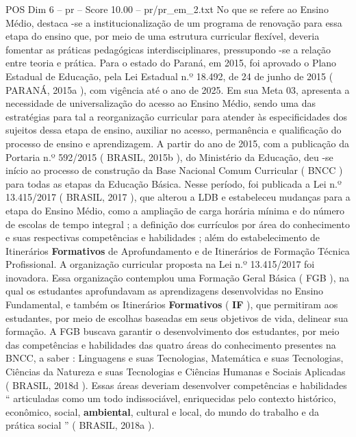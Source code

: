 \begin{textsample}{POS Dim 6 – pr – Score 10.00 – pr/pr\_em\_2.txt}
No que se refere ao Ensino Médio, destaca -se a institucionalização de um programa de renovação para essa etapa do ensino que, por meio de uma estrutura curricular flexível, deveria fomentar as práticas pedagógicas interdisciplinares, pressupondo -se a relação entre teoria e prática.
Para o estado do Paraná, em 2015, foi aprovado o Plano Estadual de Educação, pela Lei Estadual n.º 18.492, de 24 de junho de 2015 ( PARANÁ, 2015a ), com vigência até o ano de 2025.
Em sua Meta 03, apresenta a necessidade de universalização do acesso ao Ensino Médio, sendo uma das estratégias para tal a reorganização curricular para atender às especificidades dos sujeitos dessa etapa de ensino, auxiliar no acesso, permanência e qualificação do processo de ensino e aprendizagem.
A partir do ano de 2015, com a publicação da Portaria n.º 592/2015 ( BRASIL, 2015b ), do Ministério da Educação, deu -se início ao processo de construção da Base Nacional Comum Curricular ( BNCC ) para todas as etapas da Educação Básica.
Nesse período, foi publicada a Lei n.º 13.415/2017 ( BRASIL, 2017 ), que alterou a LDB e estabeleceu mudanças para a etapa do Ensino Médio, como a ampliação de carga horária mínima e do número de escolas de tempo integral ; a definição dos currículos por área do conhecimento e suas respectivas competências e habilidades ; além do estabelecimento de Itinerários \textbf{Formativos} de Aprofundamento e de Itinerários de Formação Técnica Profissional.
A organização curricular proposta na Lei n.º 13.415/2017 foi inovadora.
Essa organização contemplou uma Formação Geral Básica ( FGB ), na qual os estudantes aprofundavam as aprendizagens desenvolvidas no Ensino Fundamental, e também os Itinerários \textbf{Formativos} ( \textbf{IF} ), que permitiram aos estudantes, por meio de escolhas baseadas em seus objetivos de vida, delinear sua formação.
A FGB buscava garantir o desenvolvimento dos estudantes, por meio das competências e habilidades das quatro áreas do conhecimento presentes na BNCC, a saber : Linguagens e suas Tecnologias, Matemática e suas Tecnologias, Ciências da Natureza e suas Tecnologias e Ciências Humanas e Sociais Aplicadas ( BRASIL, 2018d ).
Essas áreas deveriam desenvolver competências e habilidades “ articuladas como um todo indissociável, enriquecidas pelo contexto histórico, econômico, social, \textbf{ambiental}, cultural e local, do mundo do trabalho e da prática social ” ( BRASIL, 2018a ).

\end{textsample}
